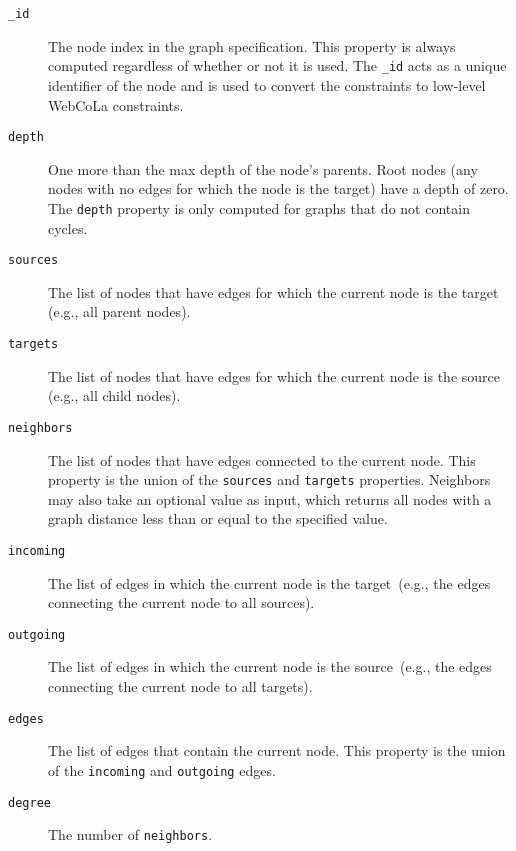 
\begin{description}
\item[\texttt{\_id}] The node index in the graph specification. This
  property is always computed regardless of whether or not it is used. The
  \texttt{\_id} acts as a unique identifier of the node and is used to 
  convert the \projectname constraints to low-level WebCoLa constraints.
\item[\texttt{depth}] One more than the max depth of the node's parents. 
	Root nodes (any nodes with no edges for which the node is the target)
	have a depth of zero. The \texttt{depth} property is only computed for
	graphs that do not contain cycles.
\item[\texttt{sources}] The list of nodes that have edges for which the
	current node is the target (e.g., all parent nodes).
\item[\texttt{targets}] The list of nodes that have edges for which the
	current node is the source (e.g., all child nodes).
\item[\texttt{neighbors}] The list of nodes that have edges connected to
  the current node. This property is the union of the \texttt{sources} and
  \texttt{targets} properties. Neighbors may also take an optional value
  as input, which returns all nodes with a graph distance less than or
  equal to the specified value.
\item[\texttt{incoming}] The list of edges in which the current node is the
	target~(e.g., the edges connecting the current node to all sources).
\item[\texttt{outgoing}] The list of edges in which the current node is the
	source~(e.g., the edges connecting the current node to all targets).
\item[\texttt{edges}] The list of edges that contain the current node. This
	property is the union of the \texttt{incoming} and \texttt{outgoing} edges.
\item[\texttt{degree}] The number of \texttt{neighbors}.
\end{description}
\constraintsFigure

